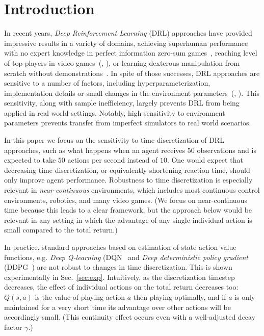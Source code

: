
\section{Introduction}
\label{sec:intro}
In recent years, \emph{Deep Reinforcement Learning} (DRL) approaches have
provided impressive results in a variety of domains, achieving superhuman
performance with no expert knowledge in perfect information zero-sum
games~\cite{alphazero}, reaching level of top players in video
games~(\citealt{openai_five}, \citealt{dqn}), or learning dexterous manipulation
from scratch without demonstrations~\cite{hand_control}. 
In spite of those successes, DRL approaches are
sensitive to a number of factors, including hyperparameterization,
implementation details or small changes in the environment
parameters~(\citealt{drl_matter}, \citealt{drl_matter_bis}). This sensitivity,
along with sample inefficiency, largely prevents DRL from being applied in real
world settings. Notably, high sensitivity to environment parameters prevents
transfer from imperfect simulators to real world scenarios.

In this paper we focus on the sensitivity to time discretization of DRL
approaches, such as what happens when an agent receives $50$ observations
and is expected to take $50$ actions per second instead of $10$. One
would expect that decreasing time discretization, or equivalently
shortening reaction time, should only improve agent performance.
Robustness to time discretization is especially relevant in
\emph{near-continuous} environments, which includes most continuous
control environments, robotics, and many video games.  (We focus on
near-continuous time because this leads to a clear framework, but the
approach below would be relevant in any setting in which the advantage of
any single individual action is small compared to the total return.)%

In practice, standard approaches based on estimation of state action value functions, e.g.
\emph{Deep Q-learning} (DQN~\citep{dqn} and \emph{Deep deterministic policy
gradient} (DDPG~\citep{ddpg}) are not robust to changes in time discretization. This is shown experimentally in Sec.~\ref{sec:exp}. 
Intuitively, as the discretization timestep
decreases, the effect of individual actions on the total return decreases
too: $Q(s,a)$ is the value of playing action $a$ then playing optimally,
and if $a$ is only maintained for a very short time its advantage over
other actions will be accordingly small. (This continuity effect occurs even with a
well-adjusted decay factor $\gamma$.)

